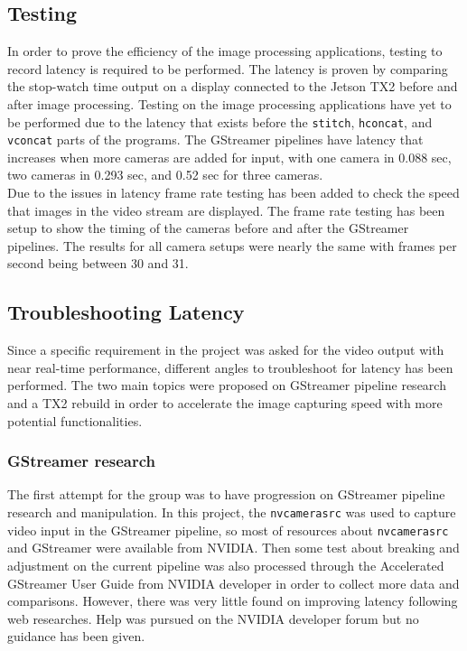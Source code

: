 \documentclass[letterpaper,10pt,serif,draftclsnofoot,onecolumn,compsoc,titlepage]{IEEEtran}
\begin{document}
\subsection{Testing}

In order to prove the efficiency of the image processing applications, 
testing to record latency is required to be performed. The latency is proven by 
comparing the stop-watch time output on a display connected to the Jetson TX2 before and after 
image processing. Testing on the image processing applications have yet to be performed 
due to the latency that exists before the \texttt{stitch}, \texttt{hconcat}, and 
\texttt{vconcat} parts of the programs.
The GStreamer pipelines have latency that increases when more cameras are added for 
input, with one camera in 0.088 sec, two cameras in 0.293 sec, and 0.52 sec for three 
cameras. \\

Due to the issues in latency frame rate testing has been added to check the speed that 
images in the video stream are displayed.
The frame rate testing has been setup to show the timing of the cameras before and after 
the GStreamer pipelines. The results for all camera setups were nearly the same with 
frames per second being between 30 and 31. \\

\subsection{Troubleshooting Latency}
Since a specific requirement in the project was asked for the video output with near real-time 
performance, different angles to troubleshoot for latency has been performed. The two main 
topics were proposed on GStreamer pipeline research and a TX2 rebuild in order to accelerate the 
image capturing speed with more potential functionalities. \\

\subsubsection{GStreamer research}

The first attempt for the group was to have progression on GStreamer pipeline research and 
manipulation. In this project, the \texttt{nvcamerasrc} was used to capture video input in the GStreamer 
pipeline, so most of resources about \texttt{nvcamerasrc} and GStreamer were available from NVIDIA. Then 
some test about breaking and adjustment on the current pipeline was also processed through the 
Accelerated GStreamer User Guide from NVIDIA developer in order to collect more data and 
comparisons. However, there was very little found on improving latency following web 
researches. Help was pursued on the NVIDIA developer forum but no 
guidance has been given. \\
\end{document}

